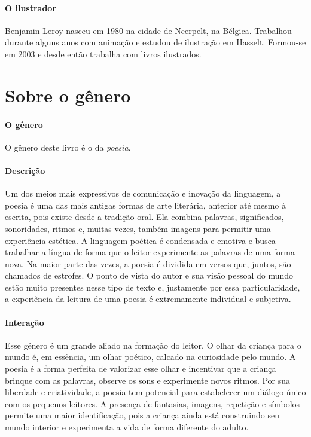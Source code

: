 \documentclass[11pt]{extarticle}
\begin{document}
\paragraph{O ilustrador} Benjamin Leroy nasceu em 1980 na cidade de Neerpelt, na Bélgica. Trabalhou durante alguns anos com animação e estudou de ilustração em Hasselt. Formou-se em 2003 e desde então trabalha com livros ilustrados.



\section{Sobre o gênero}

\paragraph{O gênero} O gênero deste livro é o da \textit{poesia}. 


\paragraph{Descrição} Um dos meios mais expressivos de comunicação e inovação da linguagem, a poesia é uma das mais antigas formas de arte literária, anterior até mesmo à escrita, pois existe desde a tradição oral. Ela combina palavras, significados, sonoridades, ritmos e, muitas vezes, também imagens para permitir uma experiência estética. A linguagem poética é condensada e emotiva e busca trabalhar a língua de forma que o leitor experimente as palavras de uma forma nova. Na maior parte das vezes, a poesia é dividida em versos que, juntos, são chamados de estrofes. O ponto de vista do autor e sua visão pessoal do mundo estão muito presentes nesse tipo de texto e, justamente por essa particularidade, a experiência da leitura de uma poesia é extremamente individual e subjetiva.

\paragraph{Interação} Esse gênero é um grande aliado na formação do leitor. O olhar da criança para o mundo é, em essência, um olhar poético, calcado na curiosidade pelo mundo. A poesia é a forma perfeita de valorizar esse olhar e incentivar que a criança brinque com as palavras, observe os sons e experimente novos ritmos. Por sua liberdade e criatividade, a poesia tem potencial para estabelecer um diálogo único com os pequenos leitores. A presença de fantasias, imagens, repetição e símbolos permite uma maior identificação, pois a criança ainda está construindo seu mundo interior e experimenta a vida de forma diferente do adulto. 
\end{document}
